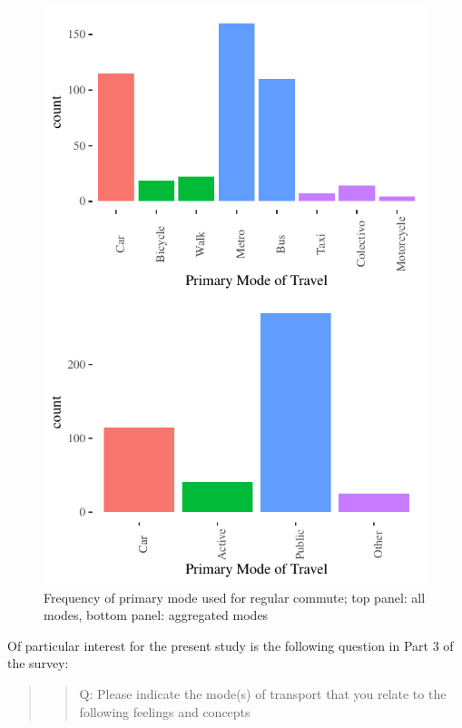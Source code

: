 \documentclass[]{elsarticle} %
\begin{document}
\begin{figure}
\centering
\includegraphics{Dissonance_Santiago_v3_files/figure-latex/figure-primary-mode-travel-1.pdf}
\caption{\label{fig:primary-mode-travel}Frequency of primary mode used
for regular commute; top panel: all modes, bottom panel: aggregated
modes}
\end{figure}

Of particular interest for the present study is the following question
in Part 3 of the survey:

\begin{quote}
\begin{quote}
Q: Please indicate the mode(s) of transport that you relate to the
following feelings and concepts
\end{quote}
\end{quote}
\end{document}
